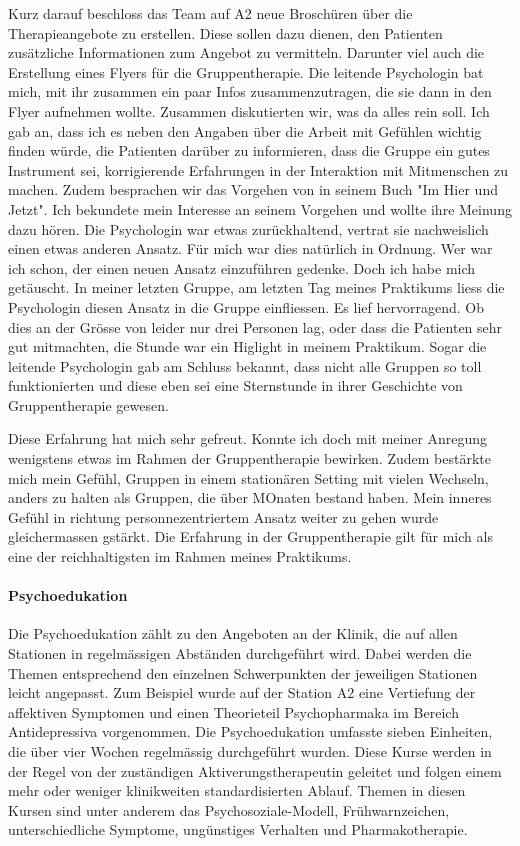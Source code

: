 Kurz darauf beschloss das Team auf A2 neue Broschüren über die Therapieangebote zu erstellen. Diese sollen dazu dienen, den Patienten zusätzliche Informationen zum Angebot zu vermitteln. Darunter viel auch die Erstellung eines Flyers für die Gruppentherapie. Die leitende Psychologin bat mich, mit ihr zusammen ein paar Infos zusammenzutragen, die sie dann in den Flyer aufnehmen wollte. Zusammen diskutierten wir, was da alles rein soll. Ich gab an, dass ich es neben den Angaben über die Arbeit mit Gefühlen wichtig finden würde, die Patienten darüber zu informieren, dass die Gruppe ein gutes Instrument sei, korrigierende Erfahrungen in der Interaktion mit Mitmenschen zu machen. Zudem besprachen wir das Vorgehen von  in seinem Buch "Im Hier und Jetzt". Ich bekundete mein Interesse an seinem Vorgehen und wollte ihre Meinung dazu hören. Die Psychologin war etwas zurückhaltend, vertrat sie nachweislich einen etwas anderen Ansatz. Für mich war dies natürlich in Ordnung. Wer war ich schon, der einen neuen Ansatz einzuführen gedenke. Doch ich habe mich getäuscht. In meiner letzten Gruppe, am letzten Tag meines Praktikums liess die Psychologin diesen Ansatz in die Gruppe einfliessen. Es lief hervorragend. Ob dies an der Grösse von leider nur drei Personen lag, oder dass die Patienten sehr gut mitmachten, die Stunde war ein Higlight in meinem Praktikum. Sogar die leitende Psychologin gab am Schluss bekannt, dass nicht alle Gruppen so toll funktionierten und diese eben sei eine Sternstunde in ihrer Geschichte von Gruppentherapie gewesen. 

Diese Erfahrung hat mich sehr gefreut. Konnte ich doch mit meiner Anregung wenigstens etwas im Rahmen der Gruppentherapie bewirken. Zudem bestärkte mich mein Gefühl, Gruppen in einem stationären Setting mit vielen Wechseln, anders zu halten als Gruppen, die über MOnaten bestand haben. Mein inneres Gefühl in richtung personnezentriertem Ansatz weiter zu gehen wurde gleichermassen gstärkt. Die Erfahrung in der Gruppentherapie gilt für mich als eine der reichhaltigsten im Rahmen meines Praktikums.

\paragraph{Psychoedukation}
Die Psychoedukation zählt zu den Angeboten an der Klinik, die auf allen Stationen in regelmässigen Abständen durchgeführt wird. Dabei werden die Themen entsprechend den einzelnen Schwerpunkten der jeweiligen Stationen leicht angepasst. Zum Beispiel wurde auf der Station A2 eine Vertiefung der affektiven Symptomen und einen Theorieteil Psychopharmaka im Bereich Antidepressiva vorgenommen. Die Psychoedukation umfasste sieben Einheiten, die über vier Wochen regelmässig durchgeführt wurden. Diese Kurse werden in der Regel von der zuständigen Aktiverungstherapeutin geleitet und folgen einem mehr oder weniger klinikweiten standardisierten Ablauf. Themen in diesen Kursen sind unter anderem das Psychosoziale-Modell, Frühwarnzeichen, unterschiedliche Symptome, ungünstiges Verhalten und Pharmakotherapie.

